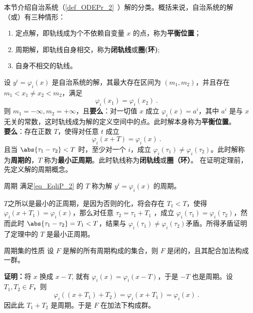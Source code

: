 
本节介绍自治系统（\autoref{def_ODEPr_2}~）解的分类。概括来说，自治系统的解（或）有三种情形：
\begin{enumerate}
\item 定点解，即轨线成为个不依赖自变量 $x$ 的点，称为\textbf{平衡位置}；
\item 周期解，即轨线自身相交，称为\textbf{闭轨线}或\textbf{圈(环)};
\item 自身不相交的轨线。
\end{enumerate}
\begin{theorem}{}\label{the_EqliP_1}
设 $y^i=\varphi_i(x)$ 是自治系统的解，其最大存在区间为 $(m_1,m_2)$，并且存在 $m_1<x_1\neq x_2<m_2$，满足
\begin{equation}\label{eq_EqliP_1}
\varphi_i(x_1)=\varphi_i(x_2)~.
\end{equation}
则 $m_1=-\infty,m_2=+\infty$，且\textbf{要么}：对一切值 $x$ 成立 $\varphi_i(x)=a^i$，其中 $a^i$ 是与 $x$ 无关的常数，这时轨线成为解的定义空间中的点。此时解本身称为\textbf{平衡位置}。\\
\textbf{要么}：存在正数 $T$，使得对任意 $t$ 成立
\begin{equation}\label{eq_EqliP_2}
\varphi_i(x+T)=\varphi_i(x)~.
\end{equation}
且当 $\abs{\tau_1-\tau_2}<T$ 时，至少对一个 $i$，成立 $\varphi_i(\tau_1)\neq\varphi_i(\tau_2)$。此时解称为\textbf{周期的}，$T$ 称为\textbf{最小正周期}。此时轨线称为\textbf{闭轨线}或\textbf{圈（环）}。
在证明定理前，先定义解的周期概念。
\end{theorem}
\begin{definition}{周期}
满足\autoref{eq_EqliP_2} 的 $T$ 称为解 $y^i=\varphi_i(x)$ 的周期。
\end{definition}
$T$之所以是最小的正周期，是因为否则的化，将会存在 $T_1<T$，使得 $\varphi_i(x+T_1)=\varphi_i(x)$，那么对任意 $\tau_2=\tau_1+T_1$ ，成立 $\varphi_i(\tau_1)=\varphi_i(\tau_2)$，然而此时 $\abs{\tau_1-\tau_2}=T_1<T$，结果与 $\varphi_i(\tau_1)\neq\varphi_i(\tau_2)$矛盾。所得矛盾证明了定理中的 $T$ 是最小正周期。

\begin{theorem}{周期集的性质}
设 $F$ 是解的所有周期构成的集合，则 $F$ 是闭的，且其配合加法构成一群。
\end{theorem}
\textbf{证明：}将 $x$ 换成 $x-T$, 就有 $\varphi_i(x)=\varphi_i(x-T)$，于是 $-T$ 也是周期。设 $T_1,T_2\in F$，则
\begin{equation}
\varphi_i((x+T_1)+T_2)=\varphi_i(x+T_1)=\varphi_i(x)~.
\end{equation}
因此此 $T_1+T_2$ 是周期。于是 $F$ 在加法下构成群。

